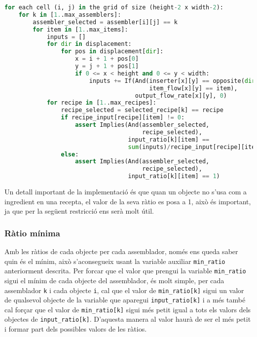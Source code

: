 \begin{lstlisting}[language=Python, caption=Input Ratio]
for each cell (i, j) in the grid of size (height-2 x width-2):
    for k in [1..max_assemblers]:
        assembler_selected = assembler[i][j] == k
        for item in [1..max_items]:
            inputs = []
            for dir in displacement:
                for pos in displacement[dir]:
                    x = i + 1 + pos[0]
                    y = j + 1 + pos[1]
                    if 0 <= x < height and 0 <= y < width:
                        inputs += If(And(inserter[x][y] == opposite(dir),
                                         item_flow[x][y] == item),
                                     output_flow_rate[x][y], 0)
            for recipe in [1..max_recipes]:
                recipe_selected = selected_recipe[k] == recipe
                if recipe_input[recipe][item] != 0:
                    assert Implies(And(assembler_selected,
                                       recipe_selected),
                                   input_ratio[k][item] == 
                                   sum(inputs)/recipe_input[recipe][item])
                else:
                    assert Implies(And(assembler_selected,
                                       recipe_selected),
                                   input_ratio[k][item] == 1)
\end{lstlisting}

Un detall important de la implementació és que quan un objecte no s'usa com a ingredient en una recepta, el valor de la seva ràtio es posa a 1, això és important, ja que per la següent restricció ens serà molt útil.

\subsubsection{Ràtio mínima}
Amb les ràtios de cada objecte per cada assemblador, només ens queda saber quin és el mínim, això s'aconsegueix usant la variable auxiliar \texttt{min\_ratio} anteriorment descrita. Per forcar que el valor que prengui la variable \texttt{min\_ratio} sigui el mínim de cada objecte del assemblador, és molt simple, per cada assemblador \texttt{k} i cada objecte \texttt{i}, cal que el valor de \texttt{min\_ratio[k]} sigui un valor de qualsevol objecte de la variable que aparegui \texttt{input\_ratio[k]} i a més també cal forçar que el valor de \texttt{min\_ratio[k]} sigui més petit igual a tots els valors dels objectes de \texttt{input\_ratio[k]}. D'aquesta manera al valor haurà de ser el més petit i formar part dels possibles valors de les ràtios.


